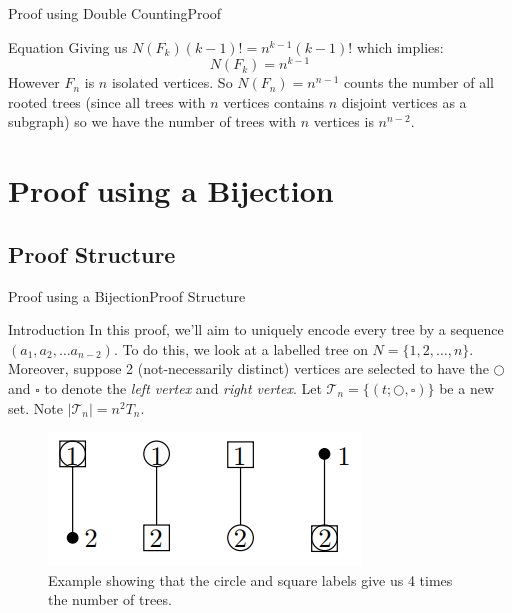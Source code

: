 \documentclass[10pt]{beamer}
\theoremstyle{definition}
\newcommand{\Stwo}{Proof using Double Counting}
\newcommand{\StwoSSproof}{Proof}
\newcommand{\Sthree}{Proof using a Bijection}
\newcommand{\SthreeSSstructure}{Proof Structure}
\begin{document}
\begin{frame}{\Stwo}{\StwoSSproof}

\begin{block}{Equation}
Giving us $N(F_{k})(k-1)!=n^{k-1}(k-1)!$ which implies: %
\[
  N(F_{k})=n^{k-1}
\]
However $F_{n}$ is $n$ isolated vertices. So $N(F_{n})=n^{n-1}$ counts the number of all rooted trees (since all trees with $n$ vertices contains $n$ disjoint vertices as a subgraph) so we have the number of trees with $n$ vertices is $n^{n-2}$.
\end{block}

\end{frame}

\section{\Sthree}
\subsection{\SthreeSSstructure}
\begin{frame}{\Sthree}{\SthreeSSstructure}
\begin{block}{Introduction}
In this proof, we'll aim to uniquely encode every tree by a sequence $(a_{1},a_{2},\ldots a_{n-2})$. To do this, we look at a labelled tree on $N=\{1, 2, \ldots, n\}$. Moreover, suppose 2 (not-necessarily distinct) vertices are selected to have the $\bigcirc$ and $\square$ to denote the \textit{left vertex} and \textit{right vertex}. Let $\mathcal{T}_{n}=\{(t; \bigcirc, \square)\}$ be a new set. Note $|\mathcal{T}_{n}|=n^{2}T_{n}$.
\end{block}

\pause{}

\begin{figure}
  \includegraphics[width=0.6\linewidth]{images/section3_example.png}
  \caption{Example showing that the circle and square labels give us 4 times the number of trees.}
  \label{fig:section3_example}
\end{figure}

\end{frame}
\end{document}
